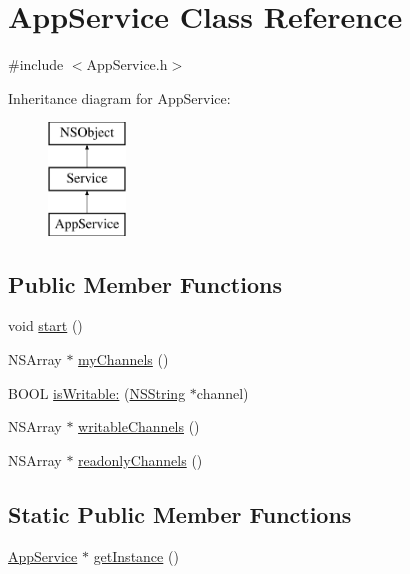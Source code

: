 \hypertarget{interface_app_service}{
\section{\-App\-Service \-Class \-Reference}
\label{interface_app_service}
}


{\ttfamily \#include $<$\-App\-Service.\-h$>$}

\-Inheritance diagram for \-App\-Service\-:\begin{figure}[H]
\begin{center}
\leavevmode
\includegraphics[height=3.000000cm]{interface_app_service}
\end{center}
\end{figure}
\subsection*{\-Public \-Member \-Functions}
\begin{DoxyCompactItemize}
\item 
void \hyperlink{interface_app_service_a71f0c097ee01e8afdc13e820d8a8ea7f}{start} ()
\item 
\-N\-S\-Array $\ast$ \hyperlink{interface_app_service_a9ce3794d2f9b975481adf72bc242ce2d}{my\-Channels} ()
\item 
\-B\-O\-O\-L \hyperlink{interface_app_service_afc426d0de90cf7f57f70b894bee9561f}{is\-Writable\-:} (\hyperlink{class_n_s_string}{\-N\-S\-String} $\ast$channel)
\item 
\-N\-S\-Array $\ast$ \hyperlink{interface_app_service_a69183a39f78572e50f7335985e2fe8b1}{writable\-Channels} ()
\item 
\-N\-S\-Array $\ast$ \hyperlink{interface_app_service_a681cc94191f25cb2d7144a2176bb85a5}{readonly\-Channels} ()
\end{DoxyCompactItemize}
\subsection*{\-Static \-Public \-Member \-Functions}
\begin{DoxyCompactItemize}
\item 
\hyperlink{interface_app_service}{\-App\-Service} $\ast$ \hyperlink{interface_app_service_a904c829c0d68b5f746c167671b312e0e}{get\-Instance} ()
\end{DoxyCompactItemize}

